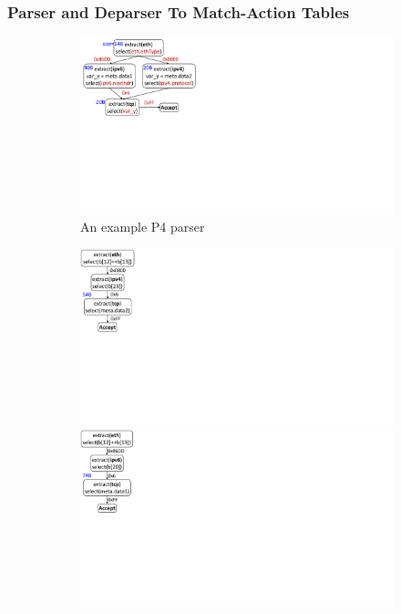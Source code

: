 \documentclass[letterpaper,twocolumn,10pt]{article}
\begin{document}
\subsubsection{Parser and Deparser To Match-Action Tables}
\label{subsection:parser-to-match-action-table}
\begin{figure}[!ht]
    \begin{subfigure}[b]{0.25\linewidth}
        \centering
        \includegraphics[trim=4 270 596 0, clip,scale=0.37]{parser-transformation-example}    
        \caption{An example P4 parser}
        \label{subfig:parser}
    \end{subfigure}
    \begin{subfigure}[b]{0.26\linewidth}
        \centering
        \includegraphics[trim=0 285 794 0, clip,scale=0.37]{parser-example-se-1}
        \includegraphics[trim=0 285 794 0, clip,scale=0.37]{parser-example-se-2}

\end{subfigure}
\end{figure}
\end{document}
